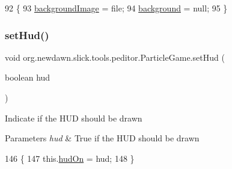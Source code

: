 \begin{DoxyCode}
92                                               \{
93         \mbox{\hyperlink{classorg_1_1newdawn_1_1slick_1_1tools_1_1peditor_1_1_particle_game_aa2b9b88381d8ce616406481d1c18a23b}{backgroundImage}} = file;
94         \mbox{\hyperlink{classorg_1_1newdawn_1_1slick_1_1tools_1_1peditor_1_1_particle_game_a89c1f8f3033d852e77f6051d381510d1}{background}} = null;
95     \}
\end{DoxyCode}
\mbox{\label{classorg_1_1newdawn_1_1slick_1_1tools_1_1peditor_1_1_particle_game_a73351b1cf03336ce2375629ba36af5f7}} 
\subsubsection{\texorpdfstring{set\+Hud()}{setHud()}}
{\footnotesize\ttfamily void org.\+newdawn.\+slick.\+tools.\+peditor.\+Particle\+Game.\+set\+Hud (\begin{DoxyParamCaption}\item[{boolean}]{hud }\end{DoxyParamCaption})\hspace{0.3cm}{\ttfamily [inline]}}

Indicate if the H\+UD should be drawn


\begin{DoxyParams}{Parameters}
{\em hud} & True if the H\+UD should be drawn \\
\hline
\end{DoxyParams}

\begin{DoxyCode}
146                                     \{
147         this.\mbox{\hyperlink{classorg_1_1newdawn_1_1slick_1_1tools_1_1peditor_1_1_particle_game_ad055acd32b363a046861f244260245f1}{hudOn}} = hud;
148     \}
\end{DoxyCode}
\mbox{\label{classorg_1_1newdawn_1_1slick_1_1tools_1_1peditor_1_1_particle_game_af9fefc9bcbfbb9fe305f823dd7052207}} 
